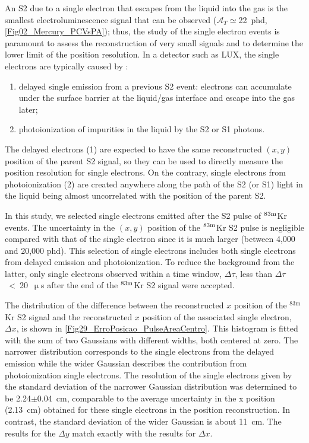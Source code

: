 \documentclass[a4paper,11pt]{article}
\begin{document}
An S2 due to a single electron that escapes from the liquid into the gas is the smallest electroluminescence signal that can be observed  ($\mathcal{A}_{T}\simeq$22~phd, \cref{Fig02_Mercury_PCVsPA}); thus, the study of the single electron events is paramount to assess the reconstruction of very small signals and to determine the lower limit of the position resolution. In a detector such as LUX, the single electrons are typically caused by \cite{EDWARDS200854, Santos2011}:
\begin{enumerate}
\item{delayed single emission from a previous S2 event: electrons can accumulate under the surface barrier at the liquid/gas interface and escape into the gas later};
\item{photoionization of impurities in the liquid by the S2 or S1 photons}.  
\end{enumerate}
The delayed electrons (1) are expected to have the same reconstructed $(x, y)$ position of the parent S2 signal, so they can be used to directly measure the position resolution for single electrons. On the contrary, single electrons from photoionization (2) are created anywhere along the path of the S2 (or S1) light in the liquid being almost uncorrelated with the position of the parent S2.

In this study, we selected single electrons emitted after the S2 pulse of ${}^{{\rm 83m}}$Kr events. The uncertainty in the $(x, y)$ position of the ${}^{{\rm 83m}}$Kr S2 pulse is negligible compared with that of the single electron since it is much larger (between 4,000 and 20,000 phd). This  selection of single electrons includes both single electrons from delayed emission and photoionization. To reduce the background from the latter, only single electrons observed within a time window, $\Delta\tau$, less than $\Delta\tau$~<~20~$\upmu$s after the end of the ${}^{{\rm 83m}}$Kr S2 signal were accepted.

The distribution of the difference between the reconstructed $x$ position of the ${}^{\mathrm{83m}}$Kr S2 signal and the reconstructed $x$ position of the associated single electron, $\Delta x$, is shown in \cref{Fig29_ErroPosicao_PulseAreaCentro}. This histogram is fitted with the sum of two Gaussians with different widths, both centered at zero. 
The narrower distribution corresponds to the single electrons from the delayed emission while the wider Gaussian describes the contribution from photoionization single electrons. The resolution of the single electrons given by the standard deviation of the narrower Gaussian distribution was determined to be 2.24$\pm$0.04~cm, comparable to the average uncertainty in the x position (2.13~cm) obtained for these single electrons in the position reconstruction. In contrast, the standard deviation of the wider Gaussian is about 11~cm. The results for the $\Delta y$ match exactly with the results for $\Delta x$.
\end{document}
